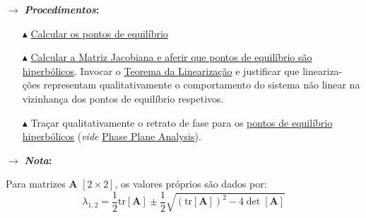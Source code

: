 {

\begin{mdframed}
    \noindent $\pmb{\rightarrow}$ \textbf{\textit{Procedimentos}:}
    \begin{itemize}
        \item[$\blacktriangle$] \hyperref[def:equilibrium-point]{Calcular os pontos de equilíbrio}

        \item[$\blacktriangle$] \hyperref[def:equilibrium-point]{Calcular a Matriz Jacobiana e aferir que pontos de equilíbrio são hiperbólicos}. Invocar o \hyperref[teo:lin-theorem]{Teorema da Linearização} e justificar que lineariza- ções representam qualitativamente o comportamento do sistema não linear na vizinhança dos pontos de equilíbrio respetivos. 

        \item[$\blacktriangle$] Traçar qualitativamente o retrato de fase para os \hyperref[def:equilibrium-point]{pontos de equilíbrio hiperbólicos} (\textit{vide} \hyperref[subsec:phase-plane-analysis]{Phase Plane Analysis}).
    \end{itemize}

    \noindent $\pmb{\rightarrow}$ \textbf{\textit{Nota}:}
    
    \noindent Para matrizes $\pmb{A}$ $[2 \times 2]$, os valores próprios são dados por:
    $$
        \lambda_{1,2} = \frac{1}{2}\text{tr}[\pmb{A}] \pm \frac{1}{2}\sqrt{\left(\text{tr}[\pmb{A}] \right)^2 - 4\det[\pmb{A}]}
    $$
\end{mdframed}
}
